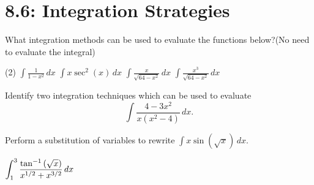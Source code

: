 \documentclass[../mathNotesPreamble]{subfiles}
\begin{document}
  \section{8.6: Integration Strategies}
    \begin{ex*}
      What integration methods can be used to evaluate the functions below?\newline (No need to evaluate the integral)
    \end{ex*}
    \begin{tasks}[after-item-skip=\stretch{1}, label=, item-indent=0pt](2)
      \task $\displaystyle \int \frac{1}{1-x^2}\,dx$
      \task $\displaystyle \int x\sec^2(x)\,dx$
      \task $\displaystyle \int \frac{x}{\sqrt{64-x^2}}\,dx$
      \task $\displaystyle \int \frac{x^3}{\sqrt{64-x^2}}\,dx$
    \end{tasks}
    \pagebreak

    \begin{ex*}
      Identify two integration techniques which can be used to evaluate 
        \[\displaystyle \int \frac{4-3x^2}{x(x^2-4)}\,dx.\]
    \end{ex*}

    \begin{ex*}
      Perform a substitution of variables to rewrite $\displaystyle \int x\sin(\sqrt{x})\,dx$.
    \end{ex*}
    \pagebreak

    \begin{ex*}
      $\displaystyle \int_{1}^{3} \frac{\tan^{-1}{\left(\sqrt{x}\right)}}{x^{1/2}+x^{3/2}}\,dx$
    \end{ex*}
    \pagebreak
\end{document}
